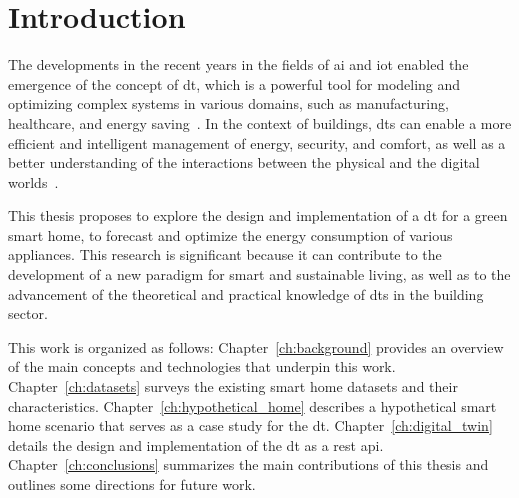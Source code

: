 \chapter{Introduction}\label{ch:introduction}

The developments in the recent years in the fields of \acrfull{ai} and \acrfull{iot} enabled the emergence of the concept of \acrfull{dt}, which is a powerful tool for modeling and optimizing complex systems in various domains, such as manufacturing, healthcare, and energy saving~\parencite{negriReviewRolesDigital2017,barricelliSurveyDigitalTwin2019,hermannDesignPrinciplesIndustrie2016}. In the context of buildings, \acrshort{dt}s can enable a more efficient and intelligent management of energy, security, and comfort, as well as a better understanding of the interactions between the physical and the digital worlds~\parencite{tagliabueLeveragingDigitalTwin2021,yangDigitalTwinsIntelligent2022}.

This thesis proposes to explore the design and implementation of a \acrshort{dt} for a green smart home, to forecast and optimize the energy consumption of various appliances. This research is significant because it can contribute to the development of a new paradigm for smart and sustainable living, as well as to the advancement of the theoretical and practical knowledge of \acrshort{dt}s in the building sector.

This work is organized as follows: Chapter~\ref{ch:background} provides an overview of the main concepts and technologies that underpin this work. Chapter~\ref{ch:datasets} surveys the existing smart home datasets and their characteristics. Chapter~\ref{ch:hypothetical_home} describes a hypothetical smart home scenario that serves as a case study for the \acrshort{dt}. Chapter~\ref{ch:digital_twin} details the design and implementation of the \acrshort{dt} as a \acrshort{rest} \acrshort{api}. Chapter~\ref{ch:conclusions} summarizes the main contributions of this thesis and outlines some directions for future work.